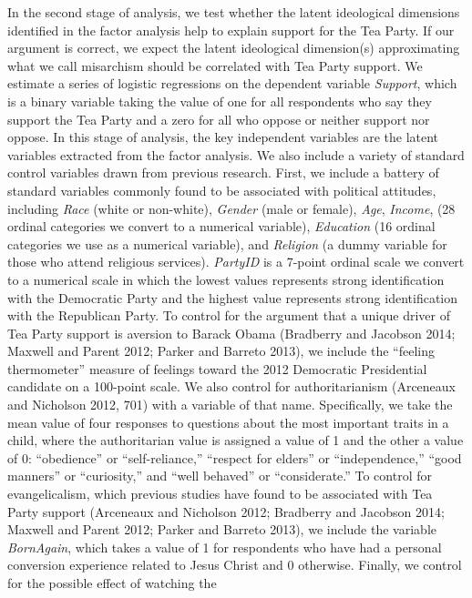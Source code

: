 \documentclass[12pt,]{article}
\begin{document}
In the second stage of analysis, we test whether the latent ideological
dimensions identified in the factor analysis help to explain support for
the Tea Party. If our argument is correct, we expect the latent
ideological dimension(s) approximating what we call misarchism should be
correlated with Tea Party support. We estimate a series of
logistic regressions on the dependent variable \emph{Support}, which is
a binary variable taking the value of one for all respondents who say
they support the Tea Party and a zero for all who oppose or neither
support nor oppose. In this stage of analysis, the key independent
variables are the latent variables extracted from the factor analysis.
We also include a variety of standard control variables drawn from
previous research. First, we include a battery of standard variables
commonly found to be associated with political attitudes, including
\emph{Race} (white or non-white), \emph{Gender} (male or female),
\emph{Age}, \emph{Income}, (28 ordinal categories we convert to a
numerical variable), \emph{Education} (16 ordinal categories we use as a
numerical variable), and \emph{Religion} (a dummy variable for those who
attend religious services). \emph{PartyID} is a 7-point ordinal scale we
convert to a numerical scale in which the lowest values represents
strong identification with the Democratic Party and the highest value
represents strong identification with the Republican Party. To control
for the argument that a unique driver of Tea Party support is aversion
to Barack Obama (Bradberry and Jacobson 2014; Maxwell and Parent 2012;
Parker and Barreto 2013), we include the ``feeling thermometer'' measure
of feelings toward the 2012 Democratic Presidential candidate on a
100-point scale. We also control for authoritarianism (Arceneaux and
Nicholson 2012, 701) with a variable of that name. Specifically, we take
the mean value of four responses to questions about the most important
traits in a child, where the authoritarian value is assigned a value of
1 and the other a value of 0: ``obedience'' or ``self-reliance,''
``respect for elders'' or ``independence,'' ``good manners'' or
``curiosity,'' and ``well behaved'' or ``considerate.'' To control for
evangelicalism, which previous studies have found to be associated with
Tea Party support (Arceneaux and Nicholson 2012; Bradberry and Jacobson
2014; Maxwell and Parent 2012; Parker and Barreto 2013), we include the
variable \emph{BornAgain}, which takes a value of 1 for respondents who
have had a personal conversion experience related to Jesus Christ and 0
otherwise. Finally, we control for the possible effect of watching the
\end{document}
